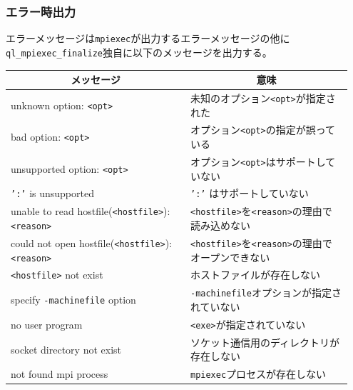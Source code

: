 \documentclass[twoside,11pt,fleqn]{book}
\begin{document}
\subsubsection*{エラー時出力}{\quad}
エラーメッセージは\texttt{mpiexec}が出力するエラーメッセージの他に\texttt{ql\_mpiexec\_finalize}独自に以下のメッセージを出力する。
\begin{table}[!h]
\footnotesize
\begin{tabular}{|p{0.50\linewidth}|p{0.45\linewidth}|} \hline
\multicolumn{1}{|c}{\textbf{メッセージ}}&\multicolumn{1}{|c|}{\textbf{意味}}\\ \hline \hline
unknown option: \texttt{<opt>} &未知のオプション\texttt{<opt>}が指定された\\ \hline
bad option: \texttt{<opt>} &オプション\texttt{<opt>}の指定が誤っている\\ \hline
unsupported option: \texttt{<opt>} &オプション\texttt{<opt>}はサポートしていない\\ \hline
\texttt{':'} is unsupported&\texttt{':'} はサポートしていない\\ \hline
unable to read hostfile(\texttt{<hostfile>}): \texttt{<reason>}&\texttt{<hostfile>}を\texttt{<reason>}の理由で読み込めない\\ \hline
could not open hostfile(\texttt{<hostfile>}): \texttt{<reason>}&\texttt{<hostfile>}を\texttt{<reason>}の理由でオープンできない\\ \hline
\texttt{<hostfile>} not exist&ホストファイルが存在しない\\ \hline
specify \texttt{-machinefile} option&\texttt{-machinefile}オプションが指定されていない\\ \hline
no user program&\texttt{<exe>}が指定されていない\\ \hline
socket directory not exist&ソケット通信用のディレクトリが存在しない\\ \hline
not found mpi process&\texttt{mpiexec}プロセスが存在しない\\ \hline
\end{tabular}
\vspace{-0em}
\end{table}
\FloatBarrier
\end{document}
